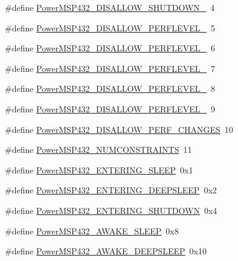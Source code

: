 \begin{DoxyCompactItemize}
\item 
\#define \hyperlink{_power_m_s_p432_8h_af8a895e1483cafa44360b9fea5dd2fb2}{Power\+M\+S\+P432\+\_\+\+D\+I\+S\+A\+L\+L\+O\+W\+\_\+\+S\+H\+U\+T\+D\+O\+W\+N\+\_}~4
\item 
\#define \hyperlink{_power_m_s_p432_8h_ad1f6e72d4104dfced74f8cc8dd7608ab}{Power\+M\+S\+P432\+\_\+\+D\+I\+S\+A\+L\+L\+O\+W\+\_\+\+P\+E\+R\+F\+L\+E\+V\+E\+L\+\_}~5
\item 
\#define \hyperlink{_power_m_s_p432_8h_a689dc7cc413b7d2dc2aea017d39208b3}{Power\+M\+S\+P432\+\_\+\+D\+I\+S\+A\+L\+L\+O\+W\+\_\+\+P\+E\+R\+F\+L\+E\+V\+E\+L\+\_}~6
\item 
\#define \hyperlink{_power_m_s_p432_8h_a9c5f53cd88165fc10bc66db2f917405a}{Power\+M\+S\+P432\+\_\+\+D\+I\+S\+A\+L\+L\+O\+W\+\_\+\+P\+E\+R\+F\+L\+E\+V\+E\+L\+\_}~7
\item 
\#define \hyperlink{_power_m_s_p432_8h_a005b6105713cba814d086ae3c75b8b2f}{Power\+M\+S\+P432\+\_\+\+D\+I\+S\+A\+L\+L\+O\+W\+\_\+\+P\+E\+R\+F\+L\+E\+V\+E\+L\+\_}~8
\item 
\#define \hyperlink{_power_m_s_p432_8h_a92df6657520cec1dd1a1fc919af53730}{Power\+M\+S\+P432\+\_\+\+D\+I\+S\+A\+L\+L\+O\+W\+\_\+\+P\+E\+R\+F\+L\+E\+V\+E\+L\+\_}~9
\item 
\#define \hyperlink{_power_m_s_p432_8h_a56cfee9843ab128c8a998e7dc4ccb8a5}{Power\+M\+S\+P432\+\_\+\+D\+I\+S\+A\+L\+L\+O\+W\+\_\+\+P\+E\+R\+F\+\_\+\+C\+H\+A\+N\+G\+E\+S}~10
\item 
\#define \hyperlink{_power_m_s_p432_8h_ae4915b00bdd5cecabb15a3797c56089e}{Power\+M\+S\+P432\+\_\+\+N\+U\+M\+C\+O\+N\+S\+T\+R\+A\+I\+N\+T\+S}~11
\item 
\#define \hyperlink{_power_m_s_p432_8h_a1604655d793840c9edb079bb812176d3}{Power\+M\+S\+P432\+\_\+\+E\+N\+T\+E\+R\+I\+N\+G\+\_\+\+S\+L\+E\+E\+P}~0x1
\item 
\#define \hyperlink{_power_m_s_p432_8h_a000bb59bb516317a759a9de5e6e24346}{Power\+M\+S\+P432\+\_\+\+E\+N\+T\+E\+R\+I\+N\+G\+\_\+\+D\+E\+E\+P\+S\+L\+E\+E\+P}~0x2
\item 
\#define \hyperlink{_power_m_s_p432_8h_a8eaa13ad1f017af39d47f3c171ad2527}{Power\+M\+S\+P432\+\_\+\+E\+N\+T\+E\+R\+I\+N\+G\+\_\+\+S\+H\+U\+T\+D\+O\+W\+N}~0x4
\item 
\#define \hyperlink{_power_m_s_p432_8h_a69f616e1f035e3daef31d2509b6dcc6c}{Power\+M\+S\+P432\+\_\+\+A\+W\+A\+K\+E\+\_\+\+S\+L\+E\+E\+P}~0x8
\item 
\#define \hyperlink{_power_m_s_p432_8h_aec611fbef5bf1b1c16a4598a09579e89}{Power\+M\+S\+P432\+\_\+\+A\+W\+A\+K\+E\+\_\+\+D\+E\+E\+P\+S\+L\+E\+E\+P}~0x10

\end{DoxyCompactItemize}
